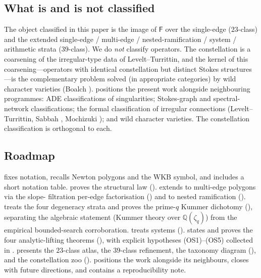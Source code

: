 \documentclass[aip,jmp,preprint,amsmath,amssymb,nofootinbib,floatfix]{revtex4-2}
\theoremstyle{plain}
\theoremstyle{definition}
\theoremstyle{remark}
\newcommand{\Fclass}{\mathsf{F}}
\begin{document}
\subsection{What is and is not classified}\label{ssec:intro-scope}

The object classified in this paper is the image of $\Fclass$ over
the single-edge ($23$-class) and the extended single-edge / multi-edge
/ nested-ramification / system / arithmetic strata ($39$-class). We
do \emph{not} classify operators. The constellation is a coarsening of
the irregular-type data of Levelt--Turrittin, and the kernel of this
coarsening---operators with identical constellation but distinct
Stokes structures---is the complementary problem solved (in
appropriate categories) by wild character varieties (Boalch
\cite{boalch-stokes,boalch-wildhodge}).  positions
the present work alongside neighbouring programmes: ADE
classifications of singularities; Stokes-graph and spectral-network
classifications; the formal classification of irregular connections
(Levelt--Turrittin, Sabbah \cite{sabbah-isomon,sabbah-polarizable},
Mochizuki \cite{mochizuki-asymptotic}); and wild character varieties.
The constellation classification is orthogonal to each.

\subsection{Roadmap}\label{ssec:intro-organisation}

 fixes notation, recalls Newton polygons and the WKB
symbol, and includes a short notation table.
 proves the structural law ().
 extends to multi-edge polygons via the slope-
filtration per-edge factorisation () and to nested
ramification ().
 treats the four degeneracy strata and proves the
prime-$q$ Kummer dichotomy (), separating the algebraic
statement (Kummer theory over $\mathbb{Q}(\zeta_q)$) from the
empirical bounded-search corroboration.
 treats systems ().
 states and proves the four analytic-lifting
theorems (), with explicit
hypotheses (OS1)--(OS5) collected in .
 presents the $23$-class atlas, the $39$-class
refinement, the taxonomy diagram (), and the
constellation zoo ().
 positions the work alongside its neighbours,
 closes with future directions, and
 contains a reproducibility note.
\end{document}

